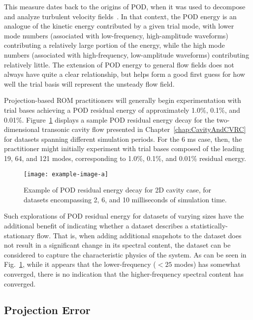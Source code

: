 This measure dates back to the origins of POD, when it was used to decompose and analyze turbulent velocity fields~\cite{berkoozPOD}.
In that context, the POD energy is an analogue of the kinetic energy contributed by a given trial mode, with lower mode numbers (associated with low-frequency, high-amplitude waveforms) contributing a relatively large portion of the energy, while the high mode numbers (associated with high-frequency, low-amplitude waveforms) contributing relatively little. The extension of POD energy to general flow fields does not always have quite a clear relationship, but helps form a good first guess for how well the trial basis will represent the unsteady flow field.

Projection-based ROM practitioners will generally begin experimentation with trial bases achieving a POD residual energy of approximately 1.0\%, 0.1\%, and 0.01\%. Figure~\ref{fig:samplePODEnergy} displays a sample POD residual energy decay for the two-dimensional transonic cavity flow presented in Chapter~\ref{chap:CavityAndCVRC} for datasets spanning different simulation periods. For the 6 ms case, then, the practitioner might initially experiment with trial bases composed of the leading 19, 64, and 121 modes, corresponding to 1.0\%, 0.1\%, and 0.01\% residual energy.

\begin{figure}
	\centering
	\texttt{[image: example-image-a]}
	\caption{\label{fig:samplePODEnergy}Example of POD residual energy decay for 2D cavity case, for datasets encompassing 2, 6, and 10 milliseconds of simulation time.}
\end{figure}

Such explorations of POD residual energy for datasets of varying sizes have the additional benefit of indicating whether a dataset describes a statistically-stationary flow. That is, when adding additional snapshots to the dataset does not result in a significant change in its spectral content, the dataset can be considered to capture the characteristic physics of the system. As can be seen in Fig.~\ref{fig:samplePODEnergy}, while it appears that the lower-frequency ($< 25$ modes) has somewhat converged, there is no indication that the higher-frequency spectral content has converged.

\subsection{Projection Error}\label{subsec:projError}

